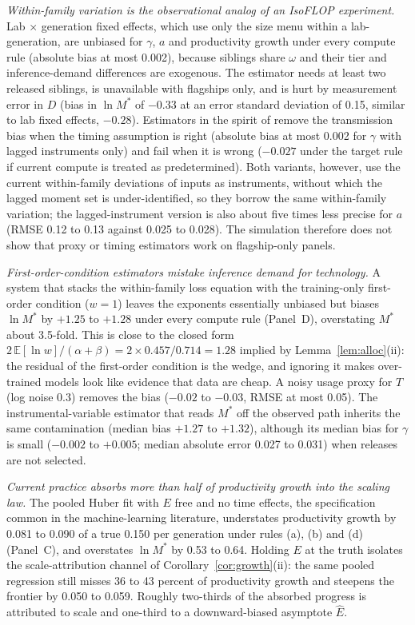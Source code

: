 \documentclass[AER,finalmode]{AEA}
\theoremstyle{definition}
\theoremstyle{remark}
\providecommand{\E}{\mathbb{E}}
\begin{document}
\textit{Within-family variation is the observational analog of an IsoFLOP experiment.} Lab $\times$ generation
fixed effects, which use only the size menu within a lab-generation, are unbiased for $\gamma$, $a$ and productivity
growth under every compute rule (absolute bias at most 0.002), because siblings share $\omega$ and their tier and
inference-demand differences are exogenous. The estimator needs at least two released siblings, is unavailable with
flagships only, and is hurt by measurement error in $D$ (bias in $\ln M^*$ of $-0.33$ at an error standard deviation
of 0.15, similar to lab fixed effects, $-0.28$). Estimators in the spirit of \citet{ackerberg2015identification}
remove the transmission bias when the timing assumption is right (absolute bias at most 0.002 for $\gamma$ with lagged
instruments only) and fail when it is wrong ($-0.027$ under the target rule if current compute is treated as
predetermined). Both variants, however, use the current within-family deviations of inputs as instruments, without
which the lagged moment set is under-identified, so they borrow the same within-family variation; the
lagged-instrument version is also about five times less precise for $a$ (RMSE 0.12 to 0.13 against 0.025 to 0.028).
The simulation therefore does not show that proxy or timing estimators work on flagship-only panels.

\textit{First-order-condition estimators mistake inference demand for technology.} A system that stacks the
within-family loss equation with the training-only first-order condition ($w=1$) leaves the exponents essentially
unbiased but biases
$\ln M^*$ by $+1.25$ to $+1.28$ under every compute rule (Panel~D), overstating $M^*$ about 3.5-fold. This is close to
the closed form $2\,\E[\ln w]/(\alpha+\beta)=2\times0.457/0.714=1.28$ implied by Lemma~\ref{lem:alloc}(ii): the
residual of the first-order condition is the wedge, and ignoring it makes over-trained models look like evidence that
data are cheap. A noisy usage proxy for $T$ (log noise 0.3) removes the bias ($-0.02$ to $-0.03$, RMSE at most 0.05).
The instrumental-variable estimator that reads $M^*$ off the observed path inherits the same contamination (median
bias $+1.27$ to $+1.32$), although its median bias for $\gamma$ is small ($-0.002$ to $+0.005$; median absolute error
0.027 to 0.031) when releases are not selected.

\textit{Current practice absorbs more than half of productivity growth into the scaling law.} The pooled Huber fit with
$E$ free and no time effects, the specification common in the machine-learning literature, understates productivity
growth by 0.081 to 0.090 of a true 0.150 per generation under rules (a), (b) and (d) (Panel~C), and overstates
$\ln M^*$ by 0.53 to 0.64. Holding $E$ at the truth isolates the scale-attribution channel of Corollary~\ref{cor:growth}(ii):
the same pooled regression still misses 36 to 43 percent of productivity growth and steepens the frontier by 0.050 to
0.059. Roughly two-thirds of the absorbed progress is attributed to scale and one-third to a downward-biased
asymptote $\hat E$.
\end{document}
